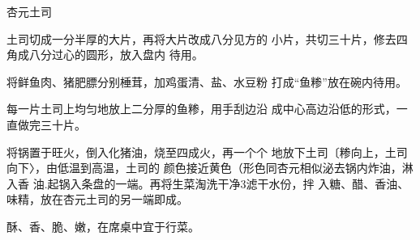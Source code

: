 \begin{recipe}{杏元土司}

\ingredients


\cooking

\step 	土司切成一分半厚的大片，再将大片改成八分见方的 小片，共切三十片，修去四角成八分过心的圆形，放入盘内 待用。

\step 将鲜鱼肉、猪肥膘分别棰茸，加鸡蛋清、盐、水豆粉 打成“鱼糁”放在碗内待用。

\step 	每一片土司上均匀地放上二分厚的鱼糁，用手刮边沿 成中心高边沿低的形式，一直做完三十片。

\step 	将锅置于旺火，倒入化猪油，烧至四成火，再一个个 地放下土司〔糁向上，土司向下〉，由低温到高温，土司的 颜色接近黄色（形色同杏元相似泌去锅内炸油，淋入香 油.起锅入条盘的一端。再将生菜淘洗干净3滤干水份，拌 入糖、醋、香油、味精，放在杏元土司的另一端即成。

\notes

酥、香、脆、嫩，在席桌中宜于行菜。

\end{recipe}

